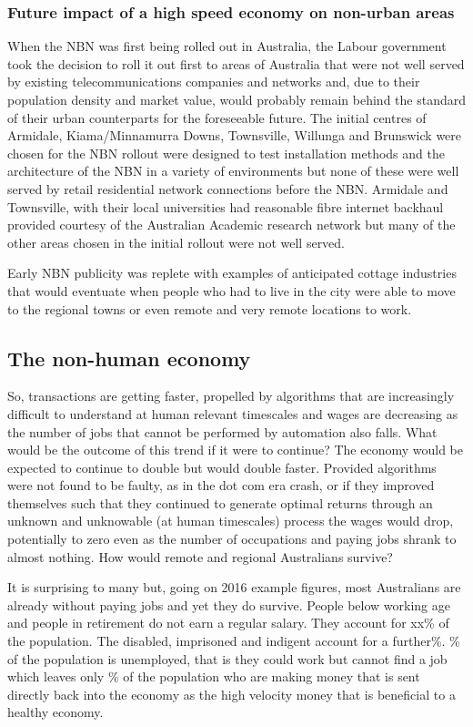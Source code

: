 \subsubsection{Future impact of a high speed economy on non-urban areas}
When the NBN was first being rolled out in Australia, the Labour government took the decision to roll it out first to areas of Australia that were not well served by existing telecommunications companies and networks and, due to their population density and market value, would probably remain behind the standard of their urban counterparts for the foreseeable future. The initial centres of Armidale, Kiama/Minnamurra Downs, Townsville, Willunga and Brunswick were chosen for the NBN rollout were designed to test installation methods and the architecture of the NBN in a variety of environments but none of these were well served by retail residential network connections before the NBN. Armidale and Townsville, with their local universities had reasonable fibre internet backhaul provided courtesy of the Australian Academic research network but many of the other areas chosen in the initial rollout were not well served. 

Early NBN publicity was replete with examples of anticipated cottage industries that would eventuate when people who had to live in the city were able to move to the regional towns or even remote and very remote locations to work.

\subsection{The non-human economy}
So, transactions are getting faster, propelled by algorithms that are increasingly difficult to understand at human relevant timescales and wages are decreasing as the number of jobs that cannot be performed by automation also falls. What would be the outcome of this trend if it were to continue? The economy would be expected to continue to double but would double faster. Provided algorithms were not found to be faulty, as in the dot com era crash, or if they improved themselves such that they continued to generate optimal returns through an unknown and unknowable (at human timescales) process the wages would drop, potentially to zero even as the number of occupations and paying jobs shrank to almost nothing. How would remote and regional Australians survive?

It is surprising to many but, going on 2016 example figures, most Australians are already without paying jobs and yet they do survive. People below working age and people in retirement do not earn a regular salary. They account for xx\% of the population. The disabled, imprisoned and indigent account for a further\%. \% of the population is unemployed, that is they could work but cannot find a job which leaves only \% of the population who are making money that is sent directly back into the economy as the high velocity money that is beneficial to a healthy economy.

